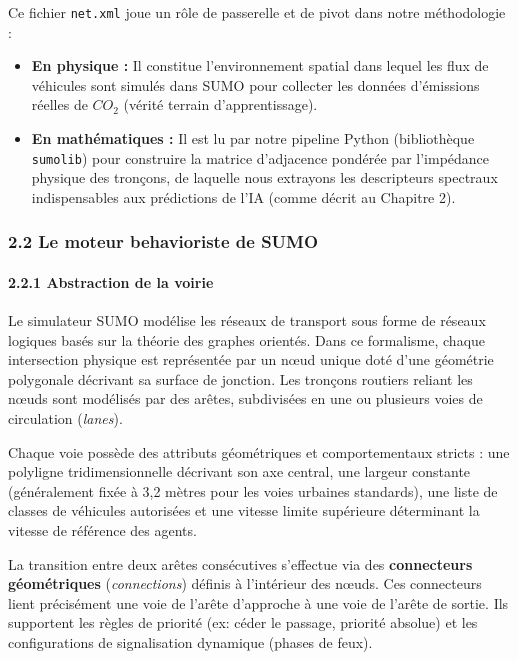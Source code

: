 \documentclass[10pt, a4paper]{article}
\providecommand{\tightlist}{}
\begin{document}
Ce fichier \texttt{net.xml} joue un rôle de passerelle et de pivot dans
notre méthodologie :

\begin{itemize}
\tightlist
\item
  \textbf{En physique :} Il constitue l'environnement spatial dans
  lequel les flux de véhicules sont simulés dans SUMO pour collecter les
  données d'émissions réelles de \(CO_2\) (vérité terrain
  d'apprentissage).
\item
  \textbf{En mathématiques :} Il est lu par notre pipeline Python
  (bibliothèque \texttt{sumolib}) pour construire la matrice d'adjacence
  pondérée par l'impédance physique des tronçons, de laquelle nous
  extrayons les descripteurs spectraux indispensables aux prédictions de
  l'IA (comme décrit au Chapitre 2).
\end{itemize}

\subsubsection{2.2 Le moteur behavioriste de
SUMO}\label{le-moteur-behavioriste-de-sumo}

\paragraph{2.2.1 Abstraction de la
voirie}\label{abstraction-de-la-voirie}

Le simulateur SUMO modélise les réseaux de transport sous forme de
réseaux logiques basés sur la théorie des graphes orientés. Dans ce
formalisme, chaque intersection physique est représentée par un nœud
unique doté d'une géométrie polygonale décrivant sa surface de jonction.
Les tronçons routiers reliant les nœuds sont modélisés par des arêtes,
subdivisées en une ou plusieurs voies de circulation (\emph{lanes}).

Chaque voie possède des attributs géométriques et comportementaux
stricts : une polyligne tridimensionnelle décrivant son axe central, une
largeur constante (généralement fixée à 3,2 mètres pour les voies
urbaines standards), une liste de classes de véhicules autorisées et une
vitesse limite supérieure déterminant la vitesse de référence des
agents.

La transition entre deux arêtes consécutives s'effectue via des
\textbf{connecteurs géométriques} (\emph{connections}) définis à
l'intérieur des nœuds. Ces connecteurs lient précisément une voie de
l'arête d'approche à une voie de l'arête de sortie. Ils supportent les
règles de priorité (ex: céder le passage, priorité absolue) et les
configurations de signalisation dynamique (phases de feux).
\end{document}
